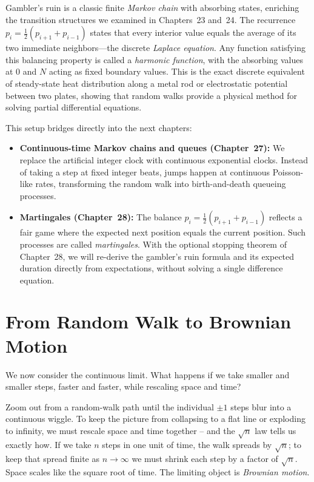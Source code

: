 \begin{connectionbox}
Gambler's ruin is a classic finite \emph{Markov chain} with absorbing states,
enriching the transition structures we examined in Chapters~23 and~24. The
recurrence $p_i = \tfrac12(p_{i+1}+p_{i-1})$ states that every interior value
equals the average of its two immediate neighbors---the discrete \emph{Laplace
equation}. Any function satisfying this balancing property is called a
\emph{harmonic function}, with the absorbing values at $0$ and $N$ acting as
fixed boundary values. This is the exact discrete equivalent of steady-state
heat distribution along a metal rod or electrostatic potential between two
plates, showing that random walks provide a physical method for solving partial
differential equations.

This setup bridges directly into the next chapters:
\begin{itemize}
\item \textbf{Continuous-time Markov chains and queues (Chapter~27):} We replace
the artificial integer clock with continuous exponential clocks. Instead of
taking a step at fixed integer beats, jumps happen at continuous Poisson-like
rates, transforming the random walk into birth-and-death queueing processes.
\item \textbf{Martingales (Chapter~28):} The balance $p_i = \tfrac12(p_{i+1}+p_{i-1})$
reflects a fair game where the expected next position equals the current
position. Such processes are called \emph{martingales}. With the optional
stopping theorem of Chapter~28, we will re-derive the gambler's ruin formula
and its expected duration directly from expectations, without solving a single
difference equation.
\end{itemize}
\end{connectionbox}

\section{From Random Walk to Brownian Motion}
\label{ch26:brownian}

We now consider the continuous limit. What happens if we take smaller and smaller steps, faster and faster, while rescaling space and time?

\begin{intuitionbox}
Zoom out from a random-walk path until the individual $\pm 1$ steps blur into a
continuous wiggle. To keep the picture from collapsing to a flat line or
exploding to infinity, we must rescale space and time together -- and the
$\sqrt{n}$ law tells us exactly how. If we take $n$ steps in one unit of time,
the walk spreads by $\sqrt{n}$; to keep that spread finite as $n \to \infty$ we
must shrink each step by a factor of $\sqrt{n}$. Space scales like the square
root of time. The limiting object is \emph{Brownian motion}.
\end{intuitionbox}

